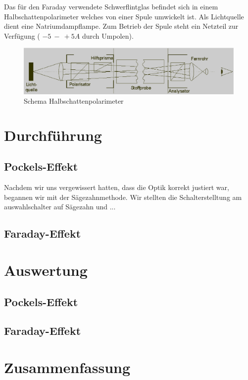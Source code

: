 \documentclass[12pt]{article}
\begin{document}
Das für den Faraday verwendete Schwerflintglas befindet sich in einem Halbschattenpolarimeter welches von einer Spule umwickelt ist. Als Lichtquelle dient eine Natriumdampflampe. Zum Betrieb der Spule steht ein Netzteil zur Verfügung ( $-5~-~+5A$ durch Umpolen).

\begin{figure}[H]
\centering
\includegraphics[width=1\linewidth]{pictures/halbschattenpolarimeter.eps}
\caption{Schema Halbschattenpolarimeter}
\end{figure}


\section{Durchführung}
\subsection{Pockels-Effekt}
Nachdem wir uns vergewissert hatten, dass die Optik korrekt justiert war, begannen wir mit der Sägezahnmethode.
Wir stellten die Schalterstelltung am auswahlschalter auf Sägezahn und ...

\subsection{Faraday-Effekt}

\section{Auswertung}

\subsection{Pockels-Effekt}

\subsection{Faraday-Effekt}

\section{Zusammenfassung}
\end{document}
